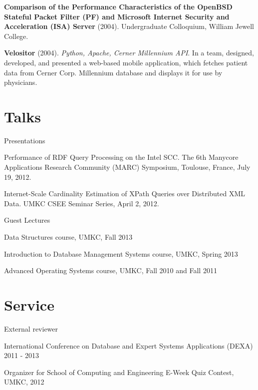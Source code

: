 \documentclass[margin,line]{resume}
\begin{document}
\begin{resume}
\vspace{-2mm}
    \textbf{Comparison of the Performance Characteristics of the OpenBSD Stateful Packet Filter (PF) and Microsoft Internet Security and Acceleration (ISA) Server} (2004). Undergraduate Colloquium, William Jewell College.

\vspace{-2mm}    
    \textbf{Velositor} (2004). \textsl{Python, Apache, Cerner Millennium API}. In a team, designed, developed, and presented a web-based mobile application, which fetches patient data from Cerner Corp. Millennium database and displays it for use by physicians.

    
    \section{\mysidestyle Talks}
    \begin{list2}
    \item Presentations
    \begin{list3}
    \item Performance of RDF Query Processing on the Intel SCC. The 6th Manycore Applications Research Community (MARC) Symposium, Toulouse, France, July 19, 2012.
    \item Internet-Scale Cardinality Estimation of XPath Queries over Distributed XML Data. UMKC CSEE Seminar Series, April 2, 2012.
    \end{list3}
    \item Guest Lectures
    \begin{list3}
    \item Data Structures course, UMKC, Fall 2013
    \item Introduction to Database Management Systems course, UMKC, Spring 2013
    \item Advanced Operating Systems course, UMKC, Fall 2010 and Fall 2011
    \end{list3}
    \end{list2}

    \section{\mysidestyle Service}
    \begin{list2}
    \item External reviewer
    \begin{list3}
    \item International Conference on Database and Expert Systems Applications (DEXA) 2011 - 2013
    \end{list3}
    \item Organizer for School of Computing and Engineering E-Week Quiz Contest, UMKC, 2012
    \end{list2}
 
\end{resume}
\end{document}
